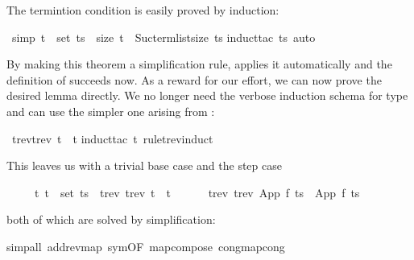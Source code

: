 %
\begin{isabellebody}%
\def\isabellecontext{Nested{\isadigit{2}}}%
%
\begin{isamarkuptext}%
\noindent
The termintion condition is easily proved by induction:%
\end{isamarkuptext}%
\ {\isacharbrackleft}simp{\isacharbrackright}{\isacharcolon}\ {\isachardoublequote}t\ {\isasymin}\ set\ ts\ {\isasymlongrightarrow}\ size\ t\ {\isacharless}\ Suc{\isacharparenleft}term{\isacharunderscore}list{\isacharunderscore}size\ ts{\isacharparenright}{\isachardoublequote}\isanewline
{}induct{\isacharunderscore}tac\ ts{\isacharcomma}\ auto{\isacharparenright}%
\begin{isamarkuptext}%
\noindent
By making this theorem a simplification rule, 
applies it automatically and the definition of 
succeeds now. As a reward for our effort, we can now prove the desired
lemma directly.  We no longer need the verbose
induction schema for type  and can use the simpler one arising from
:%
\end{isamarkuptext}%
\ {\isachardoublequote}trev{\isacharparenleft}trev\ t{\isacharparenright}\ {\isacharequal}\ t{\isachardoublequote}\isanewline
{}induct{\isacharunderscore}tac\ t\ rule{\isacharcolon}trev{\isachardot}induct{\isacharparenright}%
\begin{isamarkuptxt}%
\noindent
This leaves us with a trivial base case  and the step case
\begin{isabelle}%
\ \ \ \ \ {\isasymforall}t{\isachardot}\ t\ {\isasymin}\ set\ ts\ {\isasymlongrightarrow}\ trev\ {\isacharparenleft}trev\ t{\isacharparenright}\ {\isacharequal}\ t\ {\isasymLongrightarrow}\isanewline
\ \ \ \ \ trev\ {\isacharparenleft}trev\ {\isacharparenleft}App\ f\ ts{\isacharparenright}{\isacharparenright}\ {\isacharequal}\ App\ f\ ts%
\end{isabelle}
both of which are solved by simplification:%
\end{isamarkuptxt}%
simp{\isacharunderscore}all\ add{\isacharcolon}rev{\isacharunderscore}map\ sym{\isacharbrackleft}OF\ map{\isacharunderscore}compose{\isacharbrackright}\ cong{\isacharcolon}map{\isacharunderscore}cong{\isacharparenright}%
\begin{isamarkuptext}%
\noindent

\end{isamarkuptext}
\end{isabellebody}
